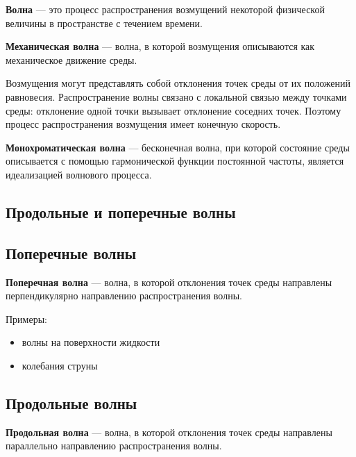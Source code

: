 \documentclass[a4paper,12pt]{article}
\begin{document}
\begin{definitionbox}
\textbf{Волна} — это процесс распространения возмущений некоторой физической величины в пространстве с течением времени.
\end{definitionbox}

\begin{definitionbox}
\textbf{Механическая волна} — волна, в которой возмущения описываются как механическое движение среды.
\end{definitionbox}

Возмущения могут представлять собой отклонения точек среды от их положений равновесия. Распространение волны связано с локальной связью между точками среды: отклонение одной точки вызывает отклонение соседних точек. Поэтому процесс распространения возмущения имеет конечную скорость.

\begin{definitionbox}
\textbf{Монохроматическая волна} — бесконечная волна, при которой состояние среды описывается с помощью гармонической функции постоянной частоты, является идеализацией волнового процесса.
\end{definitionbox}

\subsection*{Продольные и поперечные волны}

\subsection*{Поперечные волны}

\begin{definitionbox}
\textbf{Поперечная волна} — волна, в которой отклонения точек среды направлены перпендикулярно направлению распространения волны.
\end{definitionbox}

Примеры:

\begin{itemize}
\item волны на поверхности жидкости
\item колебания струны
\end{itemize}

\subsection*{Продольные волны}

\begin{definitionbox}
\textbf{Продольная волна} — волна, в которой отклонения точек среды направлены параллельно направлению распространения волны.
\end{definitionbox}
\end{document}

